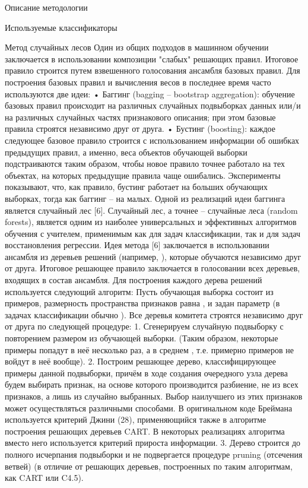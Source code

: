 \begin{section}{Описание методологии}
\begin{subsection}{Используемые классификаторы}
    \begin{subsubsection}{Метод случайных лесов}
      Один из общих подходов в машинном обучении заключается в использовании композиции "слабых" решающих правил. Итоговое правило строится путем взвешенного голосования ансамбля базовых правил. Для построения базовых правил и вычисления весов в последнее время часто используются две идеи:
•	Баггинг (bagging – bootstrap aggregation): обучение базовых правил происходит на различных случайных подвыборках данных или/и на различных случайных частях признакового описания; при этом базовые правила строятся независимо друг от друга.
•	Бустинг (boosting): каждое следующее базовое правило строится с использованием информации об ошибках предыдущих правил, а именно, веса объектов обучающей выборки подстраиваются таким образом, чтобы новое правило точнее работало на тех объектах, на которых предыдущие правила чаще ошибались.
Эксперименты показывают, что, как правило, бустинг работает на больших обучающих выборках, тогда как баггинг – на малых.
Одной из реализаций идеи баггинга является случайный лес [6].
Случайный лес, а точнее – случайные леса (random forests), является одним из наиболее универсальных и эффективных алгоритмов обучения с учителем, применимым как для задач классификации, так и для задач восстановления регрессии. Идея метода [6] заключается в использовании ансамбля из  деревьев решений (например, ), которые обучаются независимо друг от друга. Итоговое решающее правило заключается в голосовании всех деревьев, входящих в состав ансамбля.
Для построения каждого дерева решений используется следующий алгоритм:
Пусть обучающая выборка состоит из  примеров, размерность пространства признаков равна , и задан параметр  (в задачах классификации обычно ).
Все деревья комитета строятся независимо друг от друга по следующей процедуре:
1.	Сгенерируем случайную подвыборку с повторением размером  из обучающей выборки. (Таким образом, некоторые примеры попадут в неё несколько раз, а в среднем , т.е. примерно  примеров не войдут в неё вообще).
2.	Построим решающее дерево, классифицирующее примеры данной подвыборки, причём в ходе создания очередного узла дерева будем выбирать признак, на основе которого производится разбиение, не из всех  признаков, а лишь из  случайно выбранных. Выбор наилучшего из этих  признаков может осуществляться различными способами. В оригинальном коде Бреймана используется критерий Джини (28), применяющийся также в алгоритме построения решающих деревьев CART. В некоторых реализациях алгоритма вместо него используется критерий прироста информации.
3.	Дерево строится до полного исчерпания подвыборки и не подвергается процедуре pruning (отсечения ветвей) (в отличие от решающих деревьев, построенных по таким алгоритмам, как CART или C4.5).

\end{subsubsection}
\end{subsection}
\end{section}
